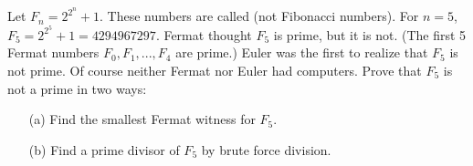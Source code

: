  Let $F_n = 2^{2^n} + 1$.
  These numbers are called  (not Fibonacci numbers).
  For $n = 5$, $F_5 = 2^{2^5} + 1 = 4294967297$.
  Fermat thought $F_5$ is prime, but it is not.
  (The first 5 Fermat numbers $F_0, F_1, ..., F_4$ are prime.)
  Euler was the first to realize that $F_5$ is not prime.
  Of course neither Fermat nor Euler had computers.
  Prove that $F_5$ is not a prime in two ways:
  \begin{enumerate}[nosep]
    \item[(a)] Find the smallest Fermat witness for $F_5$.
    \item[(b)] Find a prime divisor of $F_5$ by brute force division.
  \end{enumerate}

